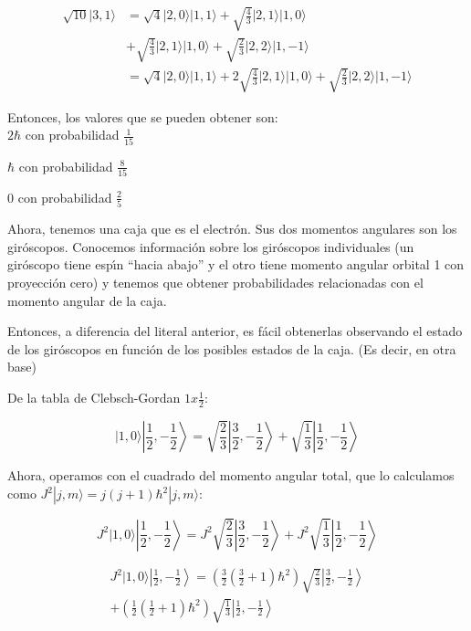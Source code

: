 \begin{solution}
\begin{parts}
  \begin{align*}
      \sqrt{10}|3,1\rangle &= \sqrt{4}|2,0\rangle |1,1\rangle +\sqrt{\frac{4}{3}}|2,1\rangle |1,0\rangle \\ 
          &+ \sqrt{\frac{4}{3}}|2,1\rangle |1,0\rangle +\sqrt{\frac{2}{3}}|2,2\rangle|1,-1\rangle\\
          &=\sqrt{4}|2,0\rangle |1,1\rangle +2\sqrt{\frac{4}{3}}|2,1\rangle |1,0\rangle +\sqrt{\frac{2}{3}}|2,2\rangle |1,-1\rangle
  \end{align*}
  
  Entonces, los valores que se pueden obtener son:\\
  
  \(2\hbar\) con probabilidad \(\frac{1}{15}\)
  
  \(\hbar\) { }con probabilidad \(\frac{8}{15}\)
  
  \(0\) { }con probabilidad \(\frac{2}{5}\)\\
  
  \item
   Ahora, tenemos una caja que es el electr{\' o}n. Sus dos momentos angulares son los gir{\' o}scopos. Conocemos informaci{\' o}n sobre los gir{\'
  o}scopos individuales (un gir{\' o}scopo tiene esp{\' \i}n {``}hacia abajo{''} y el otro tiene momento angular orbital 1 con proyecci{\' o}n cero)
  y tenemos que obtener probabilidades relacionadas con el momento angular de la caja.
  
  Entonces, a diferencia del literal anterior, es f{\' a}cil obtenerlas observando el estado de los gir{\' o}scopos en funci{\' o}n de los posibles
  estados de la caja. (Es decir, en otra base)
  
  De la tabla de Clebsch-Gordan \(1x \frac{1}{2}\):
  
  \[|1,0\rangle \left|\frac{1}{2},-\frac{1}{2}\right\rangle =\sqrt{\frac{2}{3}}\left|\frac{3}{2},-\frac{1}{2}\right\rangle +\sqrt{\frac{1}{3}}\left|\frac{1}{2},-\frac{1}{2}\right\rangle\]
  
  Ahora, operamos con el cuadrado del momento angular total, que lo calculamos como \(J^2|j,m\rangle =j(j+1)\hbar ^2|j,m\rangle\):
  
  \[J^2|1,0\rangle \left|\frac{1}{2},-\frac{1}{2}\right\rangle =J^2\sqrt{\frac{2}{3}}\left|\frac{3}{2},-\frac{1}{2}\right\rangle +J^2\sqrt{\frac{1}{3}}\left|\frac{1}{2},-\frac{1}{2}\right\rangle\]
  
  \begin{multline*}
      J^2|1,0\rangle \left|\frac{1}{2},-\frac{1}{2}\right\rangle =\left(\frac{3}{2}\left(\frac{3}{2}+1\right)\hbar ^2\right)\sqrt{\frac{2}{3}}\left|\frac{3}{2},-\frac{1}{2}\right\rangle \\
  +\left(\frac{1}{2}\left(\frac{1}{2}+1\right)\hbar ^2\right)\sqrt{\frac{1}{3}}\left|\frac{1}{2},-\frac{1}{2}\right\rangle
  \end{multline*}
  

\end{parts}
\end{solution}
